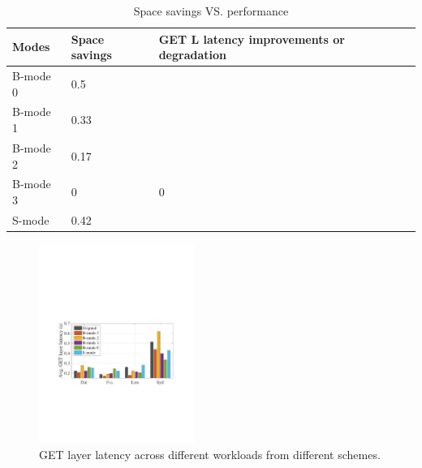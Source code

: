 \begin{table}[h!]
	\scriptsize
	\caption{Space savings VS. performance}
	\begin{tabular}{| l | l | p{3cm}| } %
		\hline
		Modes    & Space savings & GET L latency improvements or degradation  \\ 
		\hline\hline
		B-mode 0    &   0.5   &     \\ 
		\hline
		B-mode 1    &   0.33   &     \\ 
		\hline
		B-mode 2    &   0.17   &     \\
		\hline
		B-mode 3     &   0   &    0\\
		\hline
		S-mode    &  0.42    &     \\
		\hline
	\end{tabular}
	
	\label{tab:eval-schemes}
\end{table}

\begin{figure}[t]
	\centering
	\includegraphics[width=0.45\textwidth]{graphs/get-layer-latency.pdf}
	\caption{GET layer latency across different workloads from different schemes.}
	\label{fig:getlayerlatency}
	
\end{figure}

